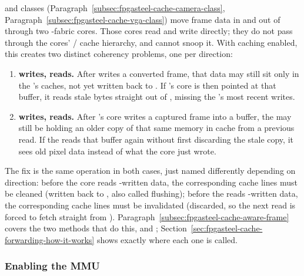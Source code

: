  and  classes (Paragraph~\ref{subsec:fpgasteel-cache-camera-class}, Paragraph~\ref{subsec:fpgasteel-cache-vga-class}) move frame data in and out of  through two -fabric  cores. Those cores read and write  directly; they do not pass through the  cores' / cache hierarchy, and cannot snoop it. With caching enabled, this creates two distinct coherency problems, one per direction:

\begin{enumerate}
    \item \textbf{ writes,  reads.} After  writes a converted  frame, that data may still sit only in the 's caches, not yet written back to . If 's  core is then pointed at that buffer, it reads stale bytes straight out of , missing the 's most recent writes.
    \item \textbf{ writes,  reads.} After 's  core writes a captured frame into a buffer, the  may still be holding an older copy of that same memory in cache from a previous read. If the  reads that buffer again without first discarding the stale copy, it sees old pixel data instead of what the  core just wrote.
\end{enumerate}

The fix is the same operation in both cases, just named differently depending on direction: before the  core reads -written data, the corresponding cache lines must be cleaned (written back to , also called flushing); before the  reads -written data, the corresponding cache lines must be invalidated (discarded, so the next read is forced to fetch straight from ). Paragraph~\ref{subsec:fpgasteel-cache-aware-frame} covers the two methods that do this,  and ; Section~\ref{sec:fpgasteel-cache-forwarding-how-it-works} shows exactly where each one is called.

\subsubsection{Enabling the MMU}
\label{subsubsec:fpgasteel-enabling-mmu}

